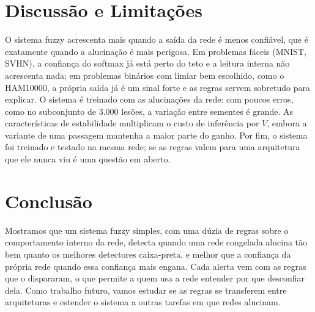 \documentclass[conference,a4paper]{IEEEtran}
\begin{document}
\section{Discussão e Limitações}
O sistema fuzzy acrescenta mais quando a saída da rede é menos confiável, que é exatamente quando a alucinação é mais perigosa. Em problemas
fáceis (MNIST, SVHN), a confiança do softmax já está perto do teto e a leitura interna não acrescenta nada; em problemas binários com limiar
bem escolhido, como o HAM10000, a própria saída já é um sinal forte e as regras servem sobretudo para explicar.
O sistema é treinado com as alucinações da rede: com poucos erros, como no subconjunto de 3.000 lesões, a variação entre sementes é grande.
As características de estabilidade multiplicam o custo de inferência por $V$, embora a variante de uma passagem mantenha a maior parte do ganho.
Por fim, o sistema foi treinado e testado na mesma rede; se as regras valem para uma arquitetura que ele nunca viu é uma questão em aberto.

\section{Conclusão}
Mostramos que um sistema fuzzy simples, com uma dúzia de regras sobre o comportamento interno da rede, detecta quando uma rede congelada
alucina tão bem quanto os melhores detectores caixa-preta, e melhor que a confiança da própria rede quando essa confiança mais engana.
Cada alerta vem com as regras que o dispararam, o que permite a quem usa a rede entender por que desconfiar dela.
Como trabalho futuro, vamos estudar se as regras se transferem entre arquiteturas e estender o sistema a outras tarefas em que redes alucinam.




\end{document}
